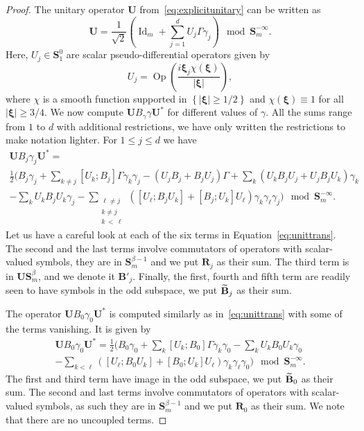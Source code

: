 \documentclass[AHL,Unicode,longabstracts,published]{cedram}
\DeclareMathOperator{\Op}{Op}
\DeclareMathOperator{\Id}{Id}
\newcommand{\bxi}{\boldsymbol \xi}
\newcommand{\BB}{\mathbf B}
\newcommand{\BS}{\mathbf S}
\newcommand{\BR}{\mathbf R}
\newcommand{\BU}{\mathbf U}
\newcommand{\abs}[1]{\left\lvert #1 \right\rvert}
\newcommand{\set}[1]{\left\{ #1 \right\}}
\let\oldtilde\tilde
\renewcommand*{\tilde}[1]{\mathchoice{\widetilde{#1}}{\widetilde{#1}}{\oldtilde{#1}}{\oldtilde{#1}}}
\begin{document}
\begin{proof}
The unitary operator $\BU$ from~\eqref{eq:explicitunitary} can be written as
\begin{equation}
\BU = \frac{1}{\sqrt 2} \left(\Id_m + \sum_{j=1}^d U_j \Gamma \gamma_j\right)
\mod \BS_m^{-\infty}.\label{eq:Udecomposed}
\end{equation}
Here, $U_j \in \BS_1^0$ are scalar pseudo-differential operators given by
\begin{equation}
U_j = \Op\left(\frac{i \bxi_j \chi(\bxi)}{\abs \bxi}\right),
\end{equation}
where $\chi$ is a smooth function supported in $\set{\abs{\bxi} \ge 1/2}$ and $\chi(\bxi) \equiv 1$ for all $\abs \bxi \ge 3/4$. We now compute $\BU B_\gamma \gamma \BU^*$ for different values of $\gamma$. All the sums range from $1$ to $d$ with additional restrictions, we have only written the restrictions to make notation lighter. For $1 \le j \le d$ we have
\begin{multline}\label{eq:unittrans}
\BU B_{j} \gamma_j \BU^*=\\
 \frac{1}{2}\Bigg(B_{j} \gamma_j + \sum_{k
\neq j}[U_k;B_{j}]\Gamma \gamma_k \gamma_j - \left(U_j B_{j} + B_{j} U_j\right) \Gamma + \sum_{k} \left(U_k B_{j} U_j + U_j B_j U_k\right) \gamma_k \\
- \sum_{k} U_k B_{j} U_k \gamma_j -
\sum_{\substack{\ell \neq j \\ k \neq j \\k\,<\,\ell}}\left([U_\ell;B_{j} U_k] + [B_{j};U_k]U_\ell \right) \gamma_k \gamma_\ell
\gamma_j
\bigg) \mod \BS_m^{- \infty}.
\end{multline}
Let us have a careful look at each of the six terms in Equation~\eqref{eq:unittrans}. The second and the last terms involve commutators of operators with scalar-valued symbols, they are in $\BS_m^{\beta - 1}$ and we put $\BR_{j}$ as their sum. The third term is in $\BU\BS^\beta_m$, and we denote it $\BB'_j$. Finally, the first, fourth and fifth term are readily seen to have symbols in the odd subspace, we put $\tilde \BB_{j}$ as their sum.

The operator $\BU B_{0} \gamma_0 \BU^*$ is computed similarly as in~\eqref{eq:unittrans} with some of the terms vanishing. It is given by
\begin{multline}
\BU B_0 \gamma_0 \BU^* =
\frac 1 2 \Bigg(B_0 \gamma_0 + \sum_{k} [U_k;B_0]
\Gamma \gamma_k \gamma_0 - \sum_k U_k B_0 U_k \gamma_0  \\- \sum_{k<\ell} ([U_\ell;B_0 U_k] + [B_0;U_k]U_\ell) \gamma_k \gamma_\ell \gamma_0\Bigg) \mod
\BS_m^{-\infty}.
\end{multline}
The first and third term have image in the odd subspace, we put $\tilde
\BB_0$ as their sum. The second and last terms involve commutators of operators with scalar-valued symbols, as such they are in $\BS_m^{\beta - 1}$ and we put $\BR_0$ as their sum. We note that there are no uncoupled terms.


\end{proof}
\end{document}
